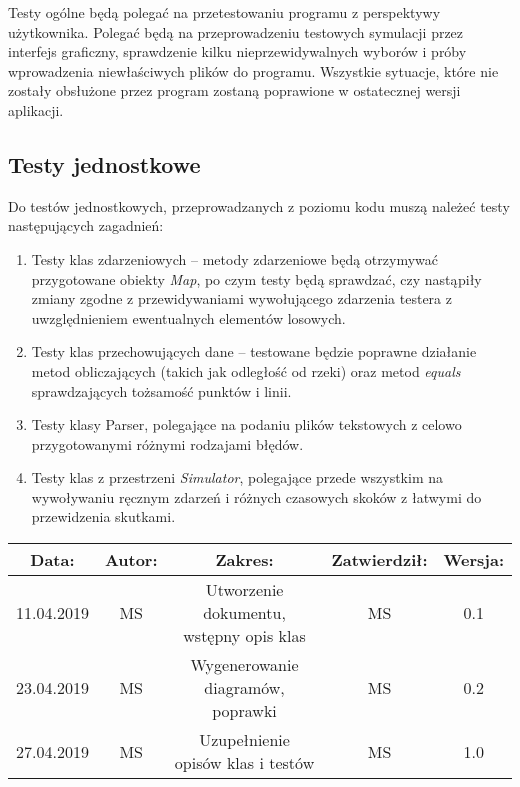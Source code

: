 \documentclass[a4paper,12pt]{article}
\newcommand\tab[1][0.6cm]{\hspace*{#1} }
\begin{document}
\tab Testy ogólne będą polegać na przetestowaniu programu z perspektywy użytkownika. Polegać będą na przeprowadzeniu testowych symulacji przez interfejs graficzny, sprawdzenie kilku nieprzewidywalnych wyborów i próby wprowadzenia niewłaściwych plików do programu. Wszystkie sytuacje, które nie zostały obsłużone przez program zostaną poprawione w ostatecznej wersji aplikacji.

\subsection{Testy jednostkowe} 

\tab Do testów jednostkowych, przeprowadzanych z poziomu kodu muszą należeć testy następujących zagadnień:

\begin{enumerate}
\item Testy klas zdarzeniowych -- metody zdarzeniowe będą otrzymywać przygotowane obiekty \textit{Map}, po czym testy będą sprawdzać, czy nastąpiły zmiany zgodne z przewidywaniami wywołującego zdarzenia testera z uwzględnieniem ewentualnych elementów losowych.

\item Testy klas przechowujących dane -- testowane będzie poprawne działanie metod obliczających (takich jak odległość od rzeki) oraz metod \textit{equals} sprawdzających tożsamość punktów i linii.

\item Testy klasy Parser, polegające na podaniu plików tekstowych z celowo przygotowanymi różnymi rodzajami błędów.

\item Testy klas z przestrzeni \textit{Simulator}, polegające przede wszystkim na wywoływaniu ręcznym zdarzeń i różnych czasowych skoków z łatwymi do przewidzenia skutkami.
\end{enumerate}


\begin{center}
\begin{tabular}{ |c|c|c|c|c| } 
 \hline
 \textbf{Data:} & \textbf{Autor:} & \textbf{Zakres:} & \textbf{Zatwierdził:} & \textbf{Wersja:} \\ 
 \hline
 11.04.2019 & MS & Utworzenie dokumentu, wstępny opis klas & MS & 0.1 \\ 
 \hline
 23.04.2019 & MS & Wygenerowanie diagramów, poprawki & MS & 0.2 \\ 
 \hline
 27.04.2019 & MS & Uzupełnienie opisów klas i testów & MS & 1.0 \\ 
 \hline
 \end{tabular}
\end{center}
\end{document}
